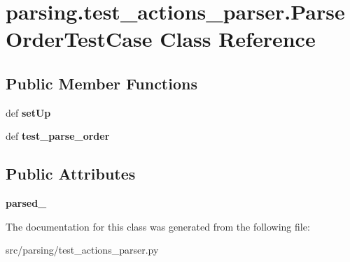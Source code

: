 \hypertarget{classparsing_1_1test__actions__parser_1_1_parse_order_test_case}{\section{parsing.\-test\-\_\-actions\-\_\-parser.\-Parse\-Order\-Test\-Case \-Class \-Reference}
\label{classparsing_1_1test__actions__parser_1_1_parse_order_test_case}
}
\subsection*{\-Public \-Member \-Functions}
\begin{DoxyCompactItemize}
\item 
\hypertarget{classparsing_1_1test__actions__parser_1_1_parse_order_test_case_a542c13566f83c37443ac4f890776fa77}{def {\bfseries set\-Up}}\label{classparsing_1_1test__actions__parser_1_1_parse_order_test_case_a542c13566f83c37443ac4f890776fa77}

\item 
\hypertarget{classparsing_1_1test__actions__parser_1_1_parse_order_test_case_af0fc1edadc710d5babb859bc2e8612cf}{def {\bfseries test\-\_\-parse\-\_\-order}}\label{classparsing_1_1test__actions__parser_1_1_parse_order_test_case_af0fc1edadc710d5babb859bc2e8612cf}

\end{DoxyCompactItemize}
\subsection*{\-Public \-Attributes}
\begin{DoxyCompactItemize}
\item 
\hypertarget{classparsing_1_1test__actions__parser_1_1_parse_order_test_case_a39b92b06c28d648c56cf51c7e385e6a8}{{\bfseries parsed\-\_}}\label{classparsing_1_1test__actions__parser_1_1_parse_order_test_case_a39b92b06c28d648c56cf51c7e385e6a8}

\end{DoxyCompactItemize}


\-The documentation for this class was generated from the following file\-:\begin{DoxyCompactItemize}
\item 
src/parsing/test\-\_\-actions\-\_\-parser.\-py\end{DoxyCompactItemize}
